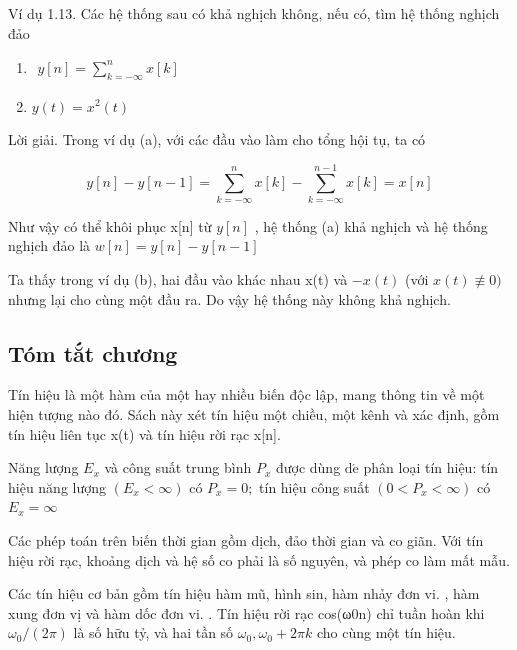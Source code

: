 \documentclass[
  10
]{article}
\begin{document}
Ví dụ 1.13. Các hệ thống sau có khả nghịch không, nếu có, tìm hệ thống
nghịch đảo

\begin{enumerate}
\def\labelenumi{(\alph{enumi})}
\item
  \(\begin{array} { r } { y [ n ] = \sum _ { k = - \infty } ^ { n } x [ k ] } \end{array}\)
\item
  \(y ( t ) = x ^ { 2 } ( t )\)
\end{enumerate}

Lời giải. Trong ví dụ (a), với các đầu vào làm cho tổng hội tụ, ta có

\[
y [ n ] - y [ n - 1 ] = \sum_ {k = - \infty} ^ {n} x [ k ] - \sum_ {k = - \infty} ^ {n - 1} x [ k ] = x [ n ]
\]

Như vậy có thể khôi phục x{[}n{]} từ \(y [ n ]\) , hệ thống (a) khả
nghịch và hệ thống nghịch đảo là \(w [ n ] = y [ n ] - y [ n - 1 ]\)

Ta thấy trong ví dụ (b), hai đầu vào khác nhau x(t) và \(- x ( t )\)
(với \(x ( t ) \not \equiv 0 )\) nhưng lại cho cùng một đầu ra. Do vậy
hệ thống này không khả nghịch. 

\subsection{Tóm tắt chương}\label{tuxf3m-tux1eaft-chux1b0ux1a1ng}

Tín hiệu là một hàm của một hay nhiều biến độc lập, mang thông tin về
một hiện tượng nào đó. Sách này xét tín hiệu một chiều, một kênh và xác
định, gồm tín hiệu liên tục x(t) và tín hiệu rời rạc x{[}n{]}.

Năng lượng \(E _ { x }\) và công suất trung bình \(P _ { x }\) được dùng
\(\mathrm { d } \acute { \mathrm { e } }\) phân loại tín hiệu: tín hiệu
năng lượng \(( E _ { x } < \infty )\) có \(P _ { x } = 0 ;\) tín hiệu
công suất \(( 0 < P _ { x } < \infty )\) có \(E _ { x } = \infty\)

Các phép toán trên biến thời gian gồm dịch, đảo thời gian và co giãn.
Với tín hiệu rời rạc, khoảng dịch và hệ số co phải là số nguyên, và phép
co làm mất mẫu.

Các tín hiệu cơ bản gồm tín hiệu hàm mũ, hình sin, hàm nhảy đơn
\(\mathrm { v i . }\) , hàm xung đơn vị và hàm dốc đơn
\(\mathrm { v i . }\) . Tín hiệu rời rạc cos(ω0n) chỉ tuần hoàn khi
\(\omega _ { 0 } / ( 2 \pi )\) là số hữu tỷ, và hai tần số
\(\omega _ { 0 } , \omega _ { 0 } + 2 \pi k\) cho cùng một tín hiệu.
\end{document}
